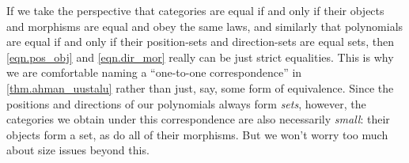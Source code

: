 \documentclass[Book-Poly]{subfiles}
\begin{document}
\begin{remark}
If we take the perspective that categories are equal if and only if their objects and morphisms are equal and obey the same laws, and similarly that polynomials are equal if and only if their position-sets and direction-sets are equal sets, then \eqref{eqn.pos_obj} and \eqref{eqn.dir_mor} really can be just strict equalities.
This is why we are comfortable naming a ``one-to-one correspondence'' in \cref{thm.ahman_uustalu} rather than just, say, some form of equivalence.
Since the positions and directions of our polynomials always form \emph{sets}, however, the categories we obtain under this correspondence are also necessarily \emph{small}: their objects form a set, as do all of their morphisms.
But we won't worry too much about size issues beyond this.
\end{remark}
\end{document}
